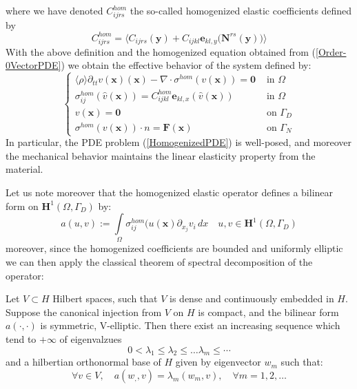 where we have denoted $C_{ijrs}^{hom}$ the so-called homogenized elastic coefficients defined by 
\begin{equation*}
    C_{ijrs}^{hom} = \big \langle C_{ijrs}(\mathbf{y}) + C_{ijkl}\mathbf{e}_{kl,y}\big(\mathbf{N}^{rs}(\mathbf{y})\big) \big \rangle 
\end{equation*}
With the above definition and the homogenized equation obtained from (\ref{Order-0VectorPDE}) we obtain the effective behavior of the system defined by:
\begin{equation}
    \label{HomogenizedPDE}
    \left \{
    \begin{array}{cc}
        \langle \rho \rangle \partial_{tt} v(\mathbf{x}) (\mathbf{x}) - \nabla \cdot \sigma^{hom} (v(\mathbf{x}) ) = \mathbf{0} & \text{ in } \Omega \\
        \sigma^{hom}_{ij}(\hat{v}(\mathbf{x})) = C^{hom}_{ijkl}\mathbf{e}_{kl,x}(\hat{v}(\mathbf{x})) & \text{ in } \Omega \\
        v(\mathbf{x}) = \mathbf{0} & \text{ on } \Gamma_D \\
        \sigma^{hom}(v(\mathbf{x})) \cdot n = \mathbf{F}(\mathbf{x}) & \text{ on } \Gamma_N
    \end{array}
    \right .
\end{equation}
In particular, the PDE problem (\ref{HomogenizedPDE}) is well-posed, and moreover the mechanical behavior maintains the linear elasticity property from the material.

Let us note moreover that the homogenized elastic operator defines a bilinear form on $\mathbf{H}^1(\Omega, \Gamma_D)$ by:
\begin{equation*}
    a(u,v) := \int \limits_{\Omega} \sigma^{hom}_{ij}(u(\mathbf{x}) \partial_{x_j} v_i \, dx \quad u,v \in \mathbf{H}^1(\Omega, \Gamma_D)
\end{equation*}
moreover, since the homogenized coefficients are bounded and uniformly elliptic we can then apply the classical theorem of spectral decomposition of the operator:
\begin{prop}
Let $V \subset H$ Hilbert spaces, such that $V$ is dense and continuously embedded in $H$. Suppose the canonical injection from $V$ on $H$ is compact, and the bilinear form $a(\cdot, \cdot)$ is symmetric, V-elliptic. Then there exist an increasing sequence which tend to $+ \infty$ of eigenvalzues
\begin{equation*}
    0 < \lambda_1 \leq \lambda_2  \leq \dots \lambda_m \leq \cdots 
\end{equation*}
and a hilbertian orthonormal base of $H$ given by eigenvector $w_m$ such that:
\begin{equation*}
    \forall v \in V, \quad a(w_,, v) = \lambda_m (w_m, v), \quad \forall m = 1, 2, \dots
\end{equation*}
\end{prop}



